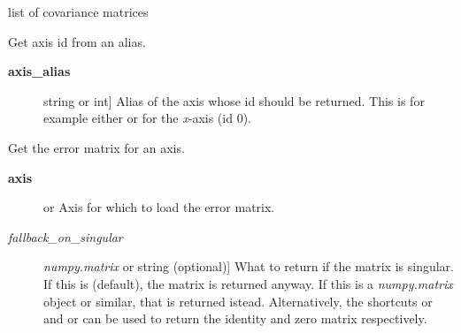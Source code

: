 \documentclass[a4paper,10pt,english]{sphinxmanual}
\begin{document}
\begin{fulllineitems}
\begin{fulllineitems}
\begin{description}
\end{description}

\end{fulllineitems}


\begin{fulllineitems}
\label{index:kafe.dataset.Dataset.cov_mats}
list of covariance matrices

\end{fulllineitems}


\begin{fulllineitems}
\label{index:kafe.dataset.Dataset.get_axis}
Get axis id from an alias.
\begin{description}
\item[{\textbf{axis\_alias}}] \leavevmode{[}string or int{]}
Alias of the axis whose id should be returned. This is for example
either  or  for the \emph{x}-axis (id 0).

\end{description}

\end{fulllineitems}


\begin{fulllineitems}
\label{index:kafe.dataset.Dataset.get_cov_mat}
Get the error matrix for an axis.
\begin{description}
\item[{\textbf{axis}}] \leavevmode{[} or \code{'y'}{]}
Axis for which to load the error matrix.

\item[{\emph{fallback\_on\_singular}}] \leavevmode{[}\emph{numpy.matrix} or string (optional){]}
What to return if the matrix is singular. If this is 
(default), the matrix is returned anyway. If this is a
\emph{numpy.matrix} object or similar, that is returned istead.
Alternatively, the shortcuts  or  and 
or  can be used to return the identity and zero matrix
respectively.

\end{description}


\end{fulllineitems}
\end{fulllineitems}
\end{document}
